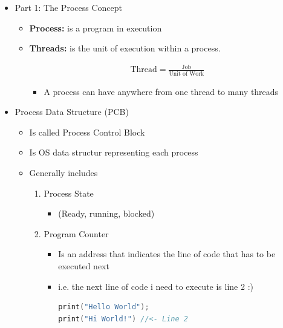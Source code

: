 \documentclass[12pt]{article}
\begin{document}
\begin{itemize}
    \item Part 1: The Process Concept
    \begin{itemize}
        \item \textbf{Process:} is a program in execution
        \item \textbf{Threads:} is the unit of execution within a process.

        \begin{align}
            \text{Thread} = \frac{\text{Job}}{\text{Unit of Work}}
        \end{align}

        \begin{itemize}
            \item A process can have anywhere from one thread to many threads
        \end{itemize}
    \end{itemize}

    \item Process Data Structure (PCB)
    \begin{itemize}
        \item Is called Process Control Block
        \item Is OS data structur representing each process
        \item Generally includes
        \begin{enumerate}
            \item Process State
            \begin{itemize}
                \item(Ready, running, blocked)
            \end{itemize}
            \item Program Counter
            \begin{itemize}
                \item Is an address that indicates the line of code
                that has to be executed next
                \item i.e. the next line of code i need to execute is line 2 :)

\begin{lstlisting}[language=c]
print("Hello World");
print("Hi World!") //<- Line 2
\end{lstlisting}


\end{itemize}
\end{enumerate}
\end{itemize}
\end{itemize}
\end{document}
